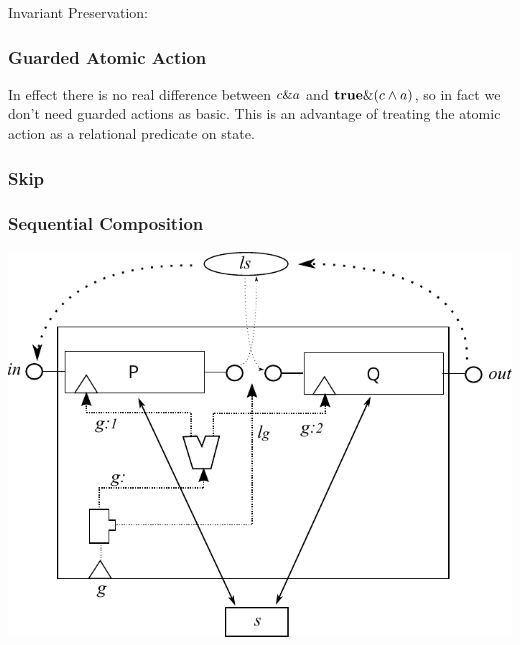 Invariant Preservation:

\subsubsection{Guarded Atomic Action}
In effect there is no real difference between $c \& a$
and $\mathbf{true} \& (c \land a)$,
so in fact we don't need guarded actions as basic.
This is an advantage of treating the atomic action as a relational predicate
on state.



\subsubsection{Skip}


\newpage
\subsubsection{Sequential Composition}

\includegraphics{images/seq-comp-actual}


